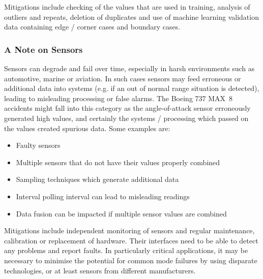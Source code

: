 Mitigations include checking of the values that are used in training, analysis of outliers and repeats, deletion of duplicates and use of machine learning validation data containing edge / corner cases and boundary cases.

\subsubsection{A Note on Sensors}
Sensors can degrade and fail over time, especially in harsh environments such as automotive, marine or aviation. In such cases sensors may feed erroneous or additional data into systems (e.g. if an out of normal range situation is detected), leading to misleading processing or false alarms. The Boeing 737 MAX~8 accidents might fall into this category as the angle-of-attack sensor erroneously generated high values, and certainly the systems / processing which passed on the values created spurious data. Some examples are:
\begin{itemize}
    \item Faulty sensors
    \item Multiple sensors that do not have their values properly combined
    \item Sampling techniques which generate additional data
    \item Interval polling interval can lead to misleading readings
    \item Data fusion can be impacted if multiple sensor values are combined
\end{itemize}

Mitigations include independent monitoring of sensors and regular maintenance, calibration or replacement of hardware. Their interfaces need to be able to detect any problems and report faults. In particularly critical applications, it may be necessary to minimise the potential for common mode failures by using disparate technologies, or at least sensors from different manufacturers.

